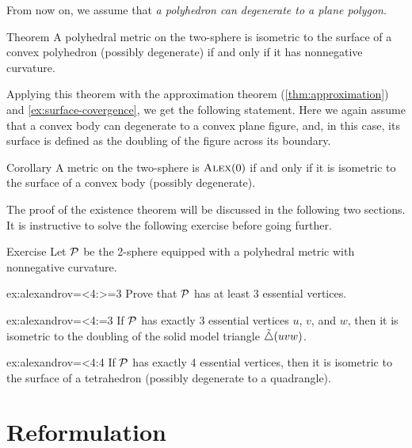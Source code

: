 From now on, we assume that \textit{a polyhedron can degenerate to a plane polygon}.

\begin{thm}{Theorem}\label{thm:alexandrov-first}
A polyhedral metric on the two-sphere is isometric to the surface of a convex polyhedron (possibly degenerate) if and only if it has nonnegative curvature.

\end{thm}

Applying this theorem with the approximation theorem (\ref{thm:approximation}) and \ref{ex:surface-covergence}, we get the following statement.
Here we again assume that a convex body can degenerate to a convex plane figure,
and, in this case, its surface is defined as the doubling of the figure across its boundary.

\begin{thm}{Corollary}\label{cor:Alex0-convex}
A metric on the two-sphere is $\textup{\textsc{Alex}}(0)$ if and only if it is isometric to the surface of a convex body (possibly degenerate).

\end{thm}

The proof of the existence theorem will be discussed in the following two sections.
It is instructive to solve the following exercise before going further.

\begin{thm}[!]{Exercise}\label{ex:alexandrov=<4}
Let $\mathcal{P}$ be the 2-sphere equipped with a polyhedral metric with nonnegative curvature.

\begin{subthm}{ex:alexandrov=<4:>=3}
Prove that $\mathcal{P}$ has at least 3 essential vertices.
\end{subthm}

\begin{subthm}{ex:alexandrov=<4:=3}
If $\mathcal{P}$ has exactly 3 essential vertices $u$, $v$, and $w$, then it is isometric to the doubling of the solid model triangle $\tilde\triangle(uvw)$.
\end{subthm}

\begin{subthm}{ex:alexandrov=<4:4}
If $\mathcal{P}$ has exactly 4 essential vertices, then it is isometric to the surface of a tetrahedron (possibly degenerate to a quadrangle).
\end{subthm}

\end{thm}

\section{Reformulation}

